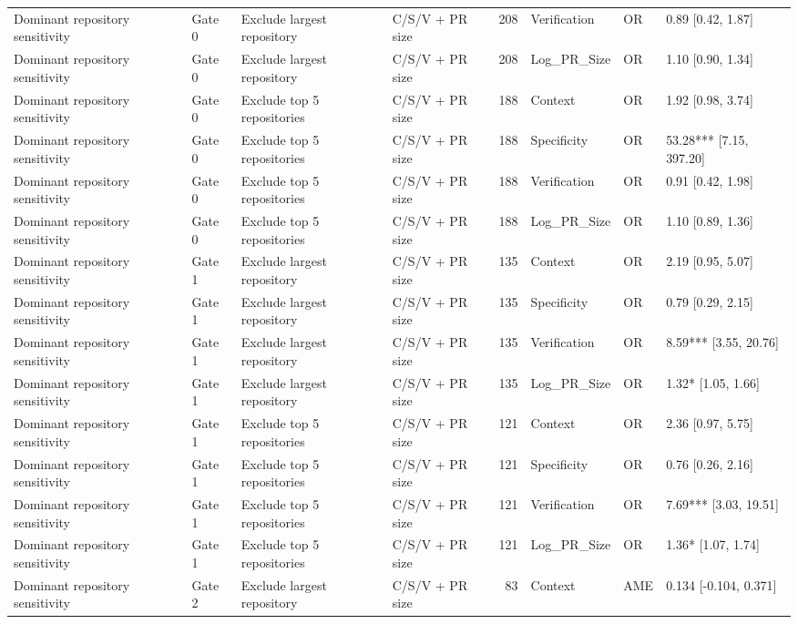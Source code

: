 \begin{table}
\begin{tabular}{llllrlll}
Dominant repository sensitivity & Gate 0 & Exclude largest repository & C/S/V + PR size & 208 & Verification & OR & 0.89 [0.42, 1.87] \\
Dominant repository sensitivity & Gate 0 & Exclude largest repository & C/S/V + PR size & 208 & Log_PR_Size & OR & 1.10 [0.90, 1.34] \\
Dominant repository sensitivity & Gate 0 & Exclude top 5 repositories & C/S/V + PR size & 188 & Context & OR & 1.92 [0.98, 3.74] \\
Dominant repository sensitivity & Gate 0 & Exclude top 5 repositories & C/S/V + PR size & 188 & Specificity & OR & 53.28*** [7.15, 397.20] \\
Dominant repository sensitivity & Gate 0 & Exclude top 5 repositories & C/S/V + PR size & 188 & Verification & OR & 0.91 [0.42, 1.98] \\
Dominant repository sensitivity & Gate 0 & Exclude top 5 repositories & C/S/V + PR size & 188 & Log_PR_Size & OR & 1.10 [0.89, 1.36] \\
Dominant repository sensitivity & Gate 1 & Exclude largest repository & C/S/V + PR size & 135 & Context & OR & 2.19 [0.95, 5.07] \\
Dominant repository sensitivity & Gate 1 & Exclude largest repository & C/S/V + PR size & 135 & Specificity & OR & 0.79 [0.29, 2.15] \\
Dominant repository sensitivity & Gate 1 & Exclude largest repository & C/S/V + PR size & 135 & Verification & OR & 8.59*** [3.55, 20.76] \\
Dominant repository sensitivity & Gate 1 & Exclude largest repository & C/S/V + PR size & 135 & Log_PR_Size & OR & 1.32* [1.05, 1.66] \\
Dominant repository sensitivity & Gate 1 & Exclude top 5 repositories & C/S/V + PR size & 121 & Context & OR & 2.36 [0.97, 5.75] \\
Dominant repository sensitivity & Gate 1 & Exclude top 5 repositories & C/S/V + PR size & 121 & Specificity & OR & 0.76 [0.26, 2.16] \\
Dominant repository sensitivity & Gate 1 & Exclude top 5 repositories & C/S/V + PR size & 121 & Verification & OR & 7.69*** [3.03, 19.51] \\
Dominant repository sensitivity & Gate 1 & Exclude top 5 repositories & C/S/V + PR size & 121 & Log_PR_Size & OR & 1.36* [1.07, 1.74] \\
Dominant repository sensitivity & Gate 2 & Exclude largest repository & C/S/V + PR size & 83 & Context & AME & 0.134 [-0.104, 0.371] \\

\end{tabular}
\end{table}
